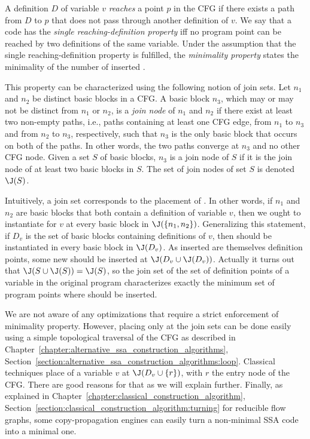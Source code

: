 A definition $D$ of variable $v$ \emph{reaches} a point $p$ in the CFG if there exists a path from $D$ to $p$ that does not pass through another definition of $v$. 
We say that a code has the \emph{single reaching-definition property} iff no program point can be reached by two definitions of the same variable. 
Under the assumption that the single reaching-definition property is fulfilled, the \emph{minimality property} states the minimality of the number of inserted \phifuns.

This property can be characterized using the following notion of join sets. 
Let $n_{1}$ and $n_{2}$ be distinct basic blocks in a CFG. 
A basic block $n_{3}$, which may or may not be distinct from $n_{1}$ or $n_{2}$, is a \emph{join node} of $n_{1}$ and $n_{2}$ if there exist at least two non-empty paths, i.e., paths containing at least one CFG edge, from $n_{1}$ to $n_{3}$ and from $n_{2}$ to $n_{3}$, respectively, such that $n_{3}$ is the only basic block that occurs on both of the paths. 
In other words, the two paths converge at $n_{3}$ and no other CFG node. 
Given a set $S$ of basic blocks, $n_{3}$ is a join node of $S$ if it is the join node of at least two basic blocks in $S$. 
The set of join nodes of set $S$ is denoted $\J(S)$.

Intuitively, a join set corresponds to the placement of \phifuns. 
In other words, if $n_{1}$ and $n_{2}$ are basic blocks that both contain a definition of variable $v$, then we ought to instantiate \phifuns for $v$ at every basic block in $\J( \{ n_{1}, n_{2} \} )$. 
Generalizing this statement, if $D_v$ is the set of basic blocks containing definitions of $v$, then \phifuns should be instantiated in every basic block in $\J(D_v)$. 
As inserted \phifuns are themselves definition points, some new \phifuns should be inserted at $\J(D_v\cup\J(D_v))$. 
Actually it turns out that $\J(S\cup\J(S))=\J(S)$, so the join set of the set of definition points of a variable in the original program characterizes exactly the minimum set of program points where \phifuns should be inserted.

We are not aware of any optimizations that require a strict enforcement of minimality property. 
However, placing \phifuns only at the join sets can be done easily using a simple topological traversal of the CFG as described in Chapter~\ref{chapter:alternative_ssa_construction_algorithms}, Section~\ref{section:alternative_ssa_construction_algorithms:loop}. 
Classical techniques place \phifuns of a variable $v$ at $\J(D_v \cup \{ r \} )$, with $r$ the entry node of the CFG. 
There are good reasons for that as we will explain further. 
Finally, as explained in Chapter~\ref{chapter:classical_construction_algorithm}, Section~\ref{section:classical_construction_algorithm:turning} for reducible flow graphs, some copy-propagation engines can easily turn a non-minimal SSA code into a minimal one.

